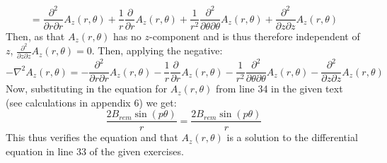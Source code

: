 \documentclass{article}
\begin{document}
\begin{equation}
=
    \frac{\partial ^{2}}{\partial r\partial r}A_{z}\left(r,\theta\right)+\frac{1}{r}\frac{\partial}{\partial r}A_{z}\left(r,\theta\right)+\frac{1}{r^{2}}\frac{\partial ^{2}}{\partial\theta\partial \theta}A_{z}\left(r,\theta\right)+\frac{\partial ^{2}}{\partial z\partial z}A_{z}\left(r,\theta\right)
\end{equation}
Then, as that $A_z (r, \theta)$ has no $z$-component and is thus therefore independent of $z$, $\frac{\partial^{2}}{\partial z\partial z}A_{z}\left(r,\theta\right)=0$.
Then, applying the negative:
\begin{equation}
    -\nabla ^{2} A_{z}\left(r,\theta\right) = - \frac{\partial ^{2}}{\partial r\partial r}A_{z}\left(r,\theta\right) - \frac{1}{r}\frac{\partial}{\partial r}A_{z}\left(r,\theta\right)-\frac{1}{r^{2}}\frac{\partial ^{2}}{\partial\theta\partial \theta}A_{z}\left(r,\theta\right)-\frac{\partial ^{2}}{\partial z\partial z}A_{z}\left(r,\theta\right)
\end{equation}
Now, substituting in the equation for $A_{z}(r ,\theta)$ from line 34 in the given text (see calculations in appendix 6) we get:
\begin{equation}
    \frac{2B_{\mathit{rem}}\sin\left(p\mathit{\theta}\right)}{r}=\frac{2B_{\mathit{rem}}\sin\left(p\mathit{\theta}\right)}{r}
\end{equation}
This thus verifies the equation and that $A_{z}\left(r,\theta\right)$ is a solution to the differential equation in line 33 of the given exercises. 
\end{document}
